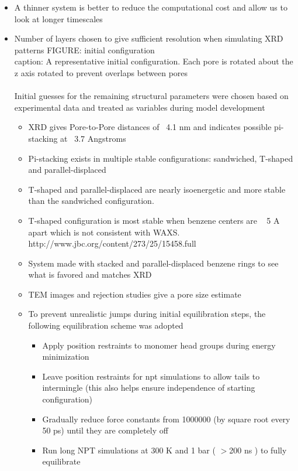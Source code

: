 \documentclass{article}
\begin{document}
	\begin{itemize}
		\item A thinner system is better to reduce the computational cost and allow us to look at longer timescales
		\item Number of layers chosen to give sufficient resolution when simulating XRD patterns
	FIGURE: initial configuration \\
	caption: A representative initial configuration. Each pore is rotated about the z axis rotated to prevent overlaps between pores \\
	\\
	\noindent Initial guesses for the remaining structural parameters were chosen based on experimental data and treated as variables during model development 
	\begin{itemize}
		\item XRD gives Pore-to-Pore distances of ~4.1 nm and indicates possible pi-stacking at ~3.7 Angstroms
		\item Pi-stacking exists in multiple stable configurations: sandwiched, T-shaped and parallel-displaced
		\item T-shaped and parallel-displaced are nearly isoenergetic and more stable than the sandwiched configuration.
		\item T-shaped configuration is most stable when benzene centers are ~ 5 A apart which is not consistent with WAXS. http://www.jbc.org/content/273/25/15458.full 
		\item System made with stacked and parallel-displaced benzene rings to see what is favored and matches XRD
		\item TEM images and rejection studies give a pore size estimate
		\item To prevent unrealistic jumps during initial equilibration steps, the following equilibration scheme was adopted
		\begin{itemize}
			\item Apply position restraints to monomer head groups during energy minimization 
			\item Leave position restraints for npt simulations to allow tails to intermingle (this also helps ensure independence of starting configuration)
			\item Gradually reduce force constants from 1000000 (by square root every 50 ps) until they are completely off
			\item Run long NPT simulations at 300 K and 1 bar ( $>$200 ns ) to fully equilibrate
		\end{itemize}
	\end{itemize}
	

\end{itemize}
\end{document}
